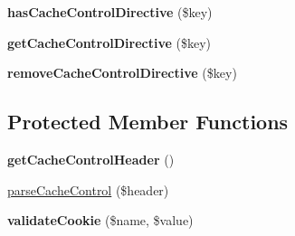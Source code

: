 \begin{DoxyCompactItemize}
\item 
\hypertarget{class_symfony_1_1_component_1_1_http_foundation_1_1_header_bag_ac9800756c1c6788144242154020190e8}{
{\bfseries has\-Cache\-Control\-Directive} (\$key)}
\label{class_symfony_1_1_component_1_1_http_foundation_1_1_header_bag_ac9800756c1c6788144242154020190e8}

\item 
\hypertarget{class_symfony_1_1_component_1_1_http_foundation_1_1_header_bag_a1dfddc51abe579dde49fe0ef48b11d2d}{
{\bfseries get\-Cache\-Control\-Directive} (\$key)}
\label{class_symfony_1_1_component_1_1_http_foundation_1_1_header_bag_a1dfddc51abe579dde49fe0ef48b11d2d}

\item 
\hypertarget{class_symfony_1_1_component_1_1_http_foundation_1_1_header_bag_af85c3ae2dc3b0d858453f481c50c61d2}{
{\bfseries remove\-Cache\-Control\-Directive} (\$key)}
\label{class_symfony_1_1_component_1_1_http_foundation_1_1_header_bag_af85c3ae2dc3b0d858453f481c50c61d2}

\end{DoxyCompactItemize}
\subsection*{\-Protected \-Member \-Functions}
\begin{DoxyCompactItemize}
\item 
\hypertarget{class_symfony_1_1_component_1_1_http_foundation_1_1_header_bag_a6fc724839b161909f18269c24d644160}{
{\bfseries get\-Cache\-Control\-Header} ()}
\label{class_symfony_1_1_component_1_1_http_foundation_1_1_header_bag_a6fc724839b161909f18269c24d644160}

\item 
\hyperlink{class_symfony_1_1_component_1_1_http_foundation_1_1_header_bag_a0d2395ec961cc4c05b9717eeb0cd2455}{parse\-Cache\-Control} (\$header)
\item 
\hypertarget{class_symfony_1_1_component_1_1_http_foundation_1_1_header_bag_a6c45b8eba57027eef2a34c8159e8eaa8}{
{\bfseries validate\-Cookie} (\$name, \$value)}
\label{class_symfony_1_1_component_1_1_http_foundation_1_1_header_bag_a6c45b8eba57027eef2a34c8159e8eaa8}

\end{DoxyCompactItemize}
